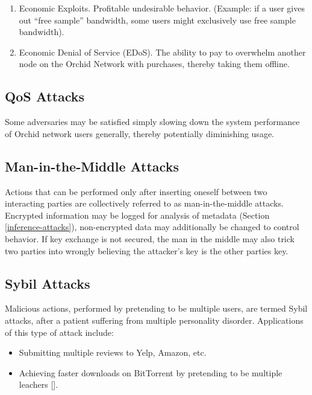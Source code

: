 \documentclass{article}
\newcommand{\mesh}{Orchid}
\begin{document}
\begin{enumerate}
    \item Economic Exploits. Profitable undesirable behavior. (Example: if a user gives out “free sample” bandwidth, some users might exclusively use free sample bandwidth).
    \item Economic Denial of Service (EDoS). The ability to pay to overwhelm another node on the \mesh{} Network with purchases, thereby taking them offline.
\end{enumerate}

\subsection{QoS Attacks}
\label{qos}

Some adversaries may be satisfied simply slowing down the system performance of \mesh{} network users generally, thereby potentially diminishing usage.

\subsection{Man-in-the-Middle Attacks}
\label{mitm}

Actions that can be performed only after inserting oneself between two interacting parties are collectively referred to as man-in-the-middle attacks. Encrypted information may be logged for analysis of metadata (Section \ref{inference-attacks}), non-encrypted data may additionally be changed to control behavior. If key exchange is not secured, the man in the middle may also trick two parties into wrongly believing the attacker's key is the other parties key.

\subsection{Sybil Attacks}

Malicious actions, performed by pretending to be multiple users, are termed Sybil attacks, after a patient suffering from multiple personality disorder. Applications of this type of attack include:

\begin{itemize}
    \item Submitting multiple reviews to Yelp, Amazon, etc.
    \item Achieving faster downloads on BitTorrent by pretending to be multiple leachers [\cite{freeridingBittorrent}].
\end{itemize}
\end{document}
